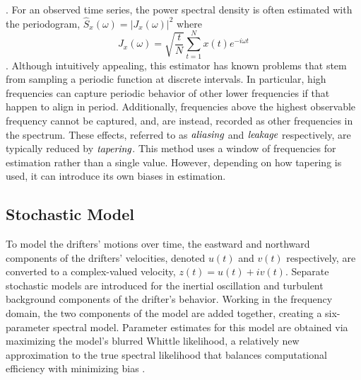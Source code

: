 \documentclass{stat572Style}
\begin{document}
\noindent \citep{Sykulski2013}. For an observed time series, the power spectral density is often estimated with the periodogram, $\hat{S}_{x}(\omega) = |J_{x}(\omega)|^{2}$ where 
\begin{equation}
\label{eq: perio}
J_{x}(\omega) = \sqrt{\frac{t}{N}} \sum_{t=1}^{N} x(t) e^{-i \omega t}
\end{equation}
\citep{Sykulski2013}. Although intuitively appealing, this estimator has known problems that stem from   sampling a periodic function at discrete intervals. In particular,  high frequencies can  capture periodic behavior of other lower frequencies if that happen to align in period. Additionally, frequencies above the highest observable frequency cannot be captured, and, are instead, recorded as other frequencies in the spectrum.  These effects, referred to as $\textbf{\it{aliasing}}$ and $\textbf{\it{leakage}}$ respectively,  are typically reduced by $\textbf{\it{tapering}}$. This method uses  a window of frequencies for estimation rather than a single value. However, depending on how tapering is used, it can introduce its own  biases in estimation.  


\subsection{Stochastic Model}
 To model the drifters' motions over time, the eastward and northward components of the drifters' velocities, denoted $u(t)$ and $v(t)$ respectively, are converted to a complex-valued velocity, $z(t) = u(t) + iv(t)$. Separate stochastic models are introduced for the inertial oscillation and turbulent background components of the drifter's behavior. Working in the frequency domain, the two components of the model are added together, creating a six-parameter spectral model. Parameter estimates for this model are obtained via maximizing the model's blurred Whittle likelihood, a relatively new approximation to the true spectral likelihood that balances computational efficiency with minimizing bias \citep{Sykulski2013}. 
 
\end{document}
